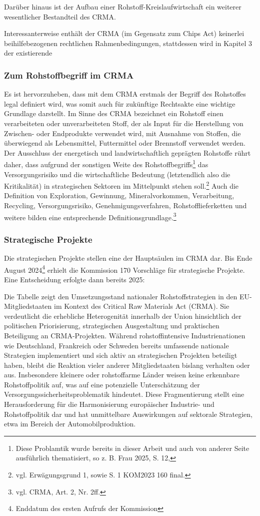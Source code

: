 \documentclass[12pt,a4paper,oneside]{book} %
\begin{document}
Darüber hinaus ist der Aufbau einer Rohstoff-Kreislaufwirtschaft ein weiterer wesentlicher Bestandteil des CRMA.


Interessanterweise enthält der CRMA (im Gegensatz zum Chips Act) keinerlei beihilfebezogenen rechtlichen Rahmenbedingungen, stattdessen wird in Kapitel 3 der existierende 


\subsubsection{Zum Rohstoffbegriff im CRMA}
Es ist hervorzuheben, dass mit dem CRMA erstmals der Begriff des Rohstoffes legal definiert wird, was somit auch für zukünftige Rechtsakte eine wichtige Grundlage darstellt. Im Sinne des CRMA bezeichnet ein Rohstoff \glqq einen verarbeiteten oder unverarbeiteten Stoff, der als Input für die Herstellung von Zwischen- oder Endprodukte verwendet wird, mit Ausnahme von Stoffen, die überwiegend als Lebensmittel, Futtermittel oder Brennstoff verwendet werden\grqq. Der Ausschluss der energetisch und landwirtschaftlich geprägten Rohstoffe rührt daher, dass aufgrund der sonstigen Weite des Rohstoffbegriffs\footnote{Diese Problamtik wurde bereits in dieser Arbeit und auch von anderer Seite ausführlich thematisiert, so z. B. Frau 2025, S. 12, } das Versorgungsrisiko und die wirtschaftliche Bedeutung (letztendlich also die \glqq Kritikalität\grqq) in strategischen Sektoren im Mittelpunkt stehen soll.\footnote{vgl. Erwägungsgrund 1, sowie S. 1 KOM2023 160 final.}
Auch die Definition von Exploration, Gewinnung, Mineralvorkommen, Verarbeitung, Recycling, Versorgungsrisiko, Genehmigungsverfahren, Rohstofflieferketten und weitere bilden eine entsprechende Definitionsgrundlage.\footnote{vgl. CRMA, Art. 2, Nr. 2ff.}

\subsubsection{Strategische Projekte}
Die strategischen Projekte stellen eine der Hauptsäulen im CRMA dar. Bis Ende August 2024\footnote{Enddatum des ersten Aufrufs der Kommission} erhielt die Kommission 170 Vorschläge für strategische Projekte. Eine Entscheidung erfolgte dann bereits 2025:

Die Tabelle zeigt den Umsetzungsstand nationaler Rohstoffstrategien in den EU-Mitgliedstaaten im Kontext des Critical Raw Materials Act (CRMA). Sie verdeutlicht die erhebliche Heterogenität innerhalb der Union hinsichtlich der politischen Priorisierung, strategischen Ausgestaltung und praktischen Beteiligung an CRMA-Projekten. Während rohstoffintensive Industrienationen wie Deutschland, Frankreich oder Schweden bereits umfassende nationale Strategien implementiert und sich aktiv an strategischen Projekten beteiligt haben, bleibt die Reaktion vieler anderer Mitgliedstaaten bislang verhalten oder aus. Insbesondere kleinere oder rohstoffarme Länder weisen keine erkennbare Rohstoffpolitik auf, was auf eine potenzielle Unterschätzung der Versorgungssicherheitsproblematik hindeutet. Diese Fragmentierung stellt eine Herausforderung für die Harmonisierung europäischer Industrie- und Rohstoffpolitik dar und hat unmittelbare Auswirkungen auf sektorale Strategien, etwa im Bereich der Automobilproduktion.
\end{document}
